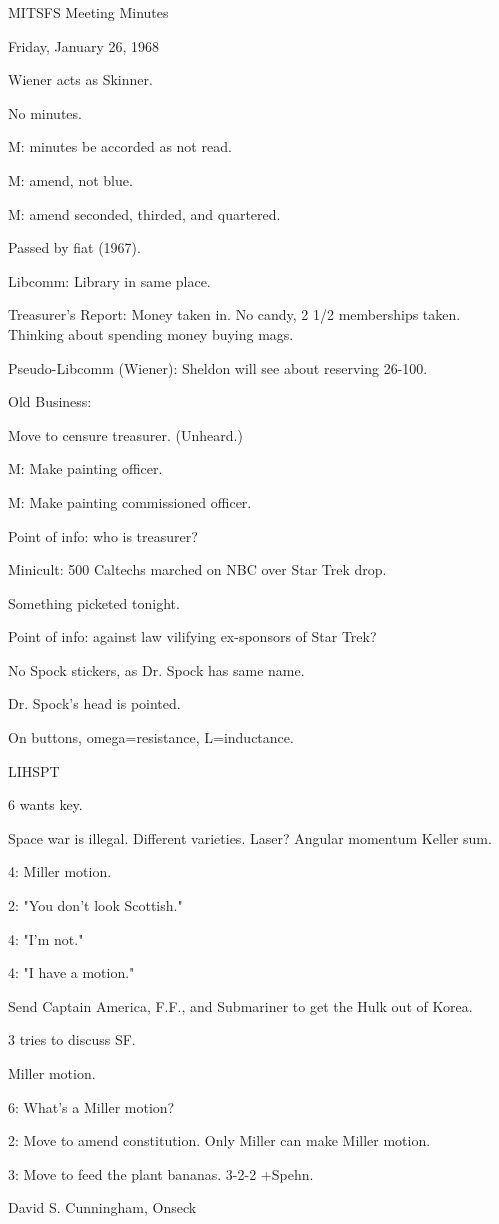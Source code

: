 \documentclass[12pt]{article}
\begin{document}
\begin{center}

MITSFS Meeting Minutes

Friday, January 26, 1968

\end{center}
 
\vspace{12pt}

\setlength{\parskip}{6pt}

\noindent
Wiener acts as Skinner.

No minutes.

M: minutes be accorded as not read.

M: amend, not blue.

M: amend seconded, thirded, and quartered.

Passed by fiat (1967).

Libcomm: Library in same place.

Treasurer's Report: Money taken in. No candy, 2 1/2 memberships taken. Thinking about spending money buying mags.

Pseudo-Libcomm (Wiener): Sheldon will see about reserving 26-100.

Old Business:

Move to censure treasurer. (Unheard.)

M: Make painting officer.

M: Make painting commissioned officer.

Point of info: who is treasurer?

Minicult: 500 Caltechs marched on NBC over Star Trek drop.

Something picketed tonight.

Point of info: against law vilifying ex-sponsors of Star Trek?

No Spock stickers, as Dr. Spock has same name.

Dr. Spock's head is pointed.

On buttons, omega=resistance, L=inductance.

LIHSPT

6 wants key.

Space war is illegal. Different varieties. Laser? Angular momentum Keller sum.

4: Miller motion.

2: "You don't look Scottish."

4: "I'm not."

4: "I have a motion."

Send Captain America, F.F., and Submariner to get the Hulk out of Korea.

3 tries to discuss SF.

Miller motion.

6: What's a Miller motion?

2: Move to amend constitution. Only Miller can make Miller motion.

3: Move to feed the plant bananas. 3-2-2 +Spehn.

\vspace{12pt}

\centerline{David S. Cunningham, Onseck}
\end{document}
